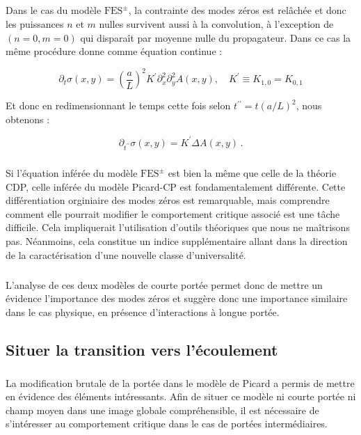\subparagraph{}Dans le cas du modèle $\text{FES}^\pm$, la contrainte des modes zéros est relâchée et donc les puissances $n$ et $m$ nulles survivent aussi à la convolution, à l'exception de $(n=0,m=0)$ qui disparaît par moyenne nulle du propagateur. Dans ce cas la même procédure donne comme équation continue : 

\begin{equation}
    \partial_t\sigma (x,y) = \left( \frac{a}{L} \right)^{2}K^\prime\partial_x^{2}\partial_y^{2}A(x, y), \quad K^\prime \equiv K_{1,0} = K_{0,1}
    \label{eq:evol:sigma:CDP:raw}
\end{equation}

\noindent Et donc en redimensionnant le temps cette fois selon $t^{\prime\prime}=t(a/L)^2$, nous obtenons :

\begin{equation}
    \partial_{t^{\prime\prime}}\sigma (x,y) = K^\prime\Delta A(x, y)\, .
    \label{eq:evol:sigma:CDP}
\end{equation}

\subparagraph{}Si l'équation inférée du modèle $\text{FES}^\pm$ est bien la même que celle de la théorie CDP, celle inférée du modèle Picard-CP est fondamentalement différente. Cette différentiation orginiaire des modes zéros est remarquable, mais comprendre comment elle pourrait modifier le comportement critique associé est une tâche difficile. Cela impliquerait l'utilisation d'outils théoriques que nous ne maîtrisons pas. Néanmoins, cela constitue un indice supplémentaire allant dans la direction de la caractérisation d'une nouvelle classe d'universalité.

\subparagraph{}L'analyse de ces deux modèles de courte portée permet donc de mettre un évidence l'importance des modes zéros et suggère donc une importance similaire dans le cas physique, en présence d'interactions à longue portée.

\subsection{Situer la transition vers l'écoulement}

\label{sec:alphaPicard}

\subparagraph{}La modification brutale de la portée dans le modèle de Picard a permis de mettre en évidence des éléments intéressants. Afin de situer ce modèle ni courte portée ni champ moyen dans une image globale compréhensible, il est nécessaire de s'intéresser au comportement critique dans le cas de portées intermédiaires. 

